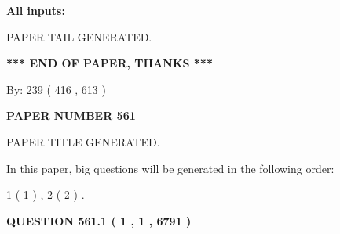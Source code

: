 \documentclass[12pt]{article}
\begin{document}
   
   
   
\noindent{}
   
   
   
   
\noindent\vspace{0.1in}\hspace{-0.08in} {\textbf{\Large{All inputs: }}}
   
   
   
   
   
   
 \vspace{0.2in}
 
   
   
\vspace{2.0in} PAPER TAIL GENERATED.
   
   
   
   
\vspace{1.0in} 
{\textbf{\large{ *** END OF PAPER, THANKS *** }}} 
   
   
\hspace{1.0in} By: 
 239 ( 416 ,  613 )
   
   
   
   
\newpage 
\setcounter{page}{ 
   561001 } 
   
   
   
   
 {\textbf{ \Large{ PAPER NUMBER  561  }}}
   
   
\vspace{0.2in}
   
   
   
   
   
   
   
   
 \vspace{0.2in}
 
 
 
 
   
   
 PAPER TITLE GENERATED.
   
   
   
\vspace{0.2in}
   
In this paper, big questions will be generated in the following order: 
   
   
   1 ( 1 )
 ,
   2 ( 2 )
 .
  
\vspace{0.2in}
  
{\textbf{\Large{QUESTION
561.1 
 ( 1 , 1 , 6791 )
}}}
  
\end{document}

